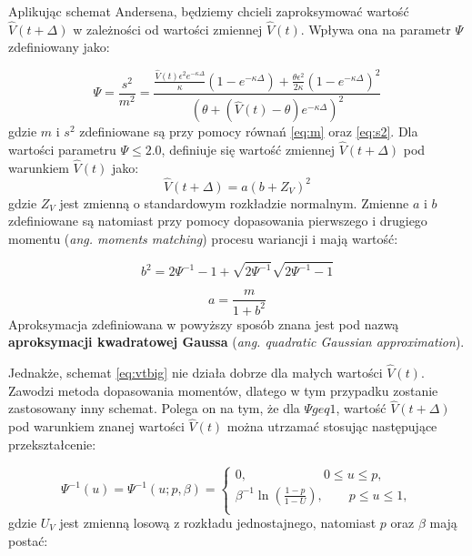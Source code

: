 \documentclass{pracamgr}
\begin{document}
Aplikując schemat Andersena, będziemy chcieli zaproksymować wartość  $\hat{V}(t + \Delta)$ w zależności od wartości zmiennej $\hat{V}(t)$. Wpływa ona na parametr $\Psi$ zdefiniowany jako:



\begin{equation}
 \label{eq:ksi}
 \Psi = \frac{s^2}{m^2} = \frac{\frac{\hat{V}(t)\epsilon^2 e^{-\kappa \Delta}}{\kappa} (1 - e^{-\kappa \Delta}) + \frac{\theta \epsilon^2}{2 \kappa}(1 - e^{-\kappa \Delta})^2}{(\theta + (\hat{V}(t) - \theta) e^{-\kappa \Delta})^2} 
\end{equation}
gdzie $m$ i $s^2$ zdefiniowane są przy pomocy równań \ref{eq:m} oraz \ref{eq:s2}.
Dla wartości parametru $\Psi \leq 2.0$, definiuje się wartość zmiennej  $\hat{V}(t + \Delta)$  pod warunkiem  $\hat{V}(t)$ jako:
\begin{equation}
 \label{eq:vtbig}
\hat{V}(t + \Delta)  = a (b + Z_V)^2
\end{equation}
gdzie $Z_V$ jest zmienną o standardowym rozkładzie normalnym. Zmienne $a$ i $b$ zdefiniowane są natomiast przy pomocy dopasowania pierwszego i drugiego momentu (\textit{ang. moments matching}) procesu wariancji i mają wartość:


\begin{equation}
\label{eq:b}
b^2 = 2 \Psi^{-1} - 1 + \sqrt{2 \Psi^{-1}} \sqrt{2 \Psi^{-1} - 1}
\end{equation}

\begin{equation}
\label{eq:a}
a = \frac{m}{1 + b^2}
\end{equation}
Aproksymacja zdefiniowana w powyższy sposób znana jest pod nazwą \textbf{aproksymacji kwadratowej Gaussa} (\textit{ang. quadratic Gaussian approximation}).


Jednakże, schemat \ref{eq:vtbig} nie działa dobrze dla małych wartości $\hat{V}(t)$. Zawodzi metoda dopasowania momentów, dlatego w tym przypadku 
zostanie zastosowany inny schemat. Polega on na tym, że dla $\Psi geq 1$, wartość $\hat{V}(t + \Delta)$ pod warunkiem znanej wartości $\hat{V}(t)$ można utrzamać stosując następujące przekształcenie:

\begin{equation}
\label{eq:psi}
\Psi^{-1}(u) = \Psi^{-1}(u;p,\beta) = \begin{cases}
               0, \qquad \qquad \qquad  0 \le u \leq p,\\
               \beta^{-1} \ln (\frac{1-p}{1-U}), \qquad  p \le u \leq 1, \\
            \end{cases} 
\end{equation} 
gdzie $U_V$ jest zmienną losową z rozkładu jednostajnego, natomiast $p$ oraz $\beta$ mają postać:
\end{document}
